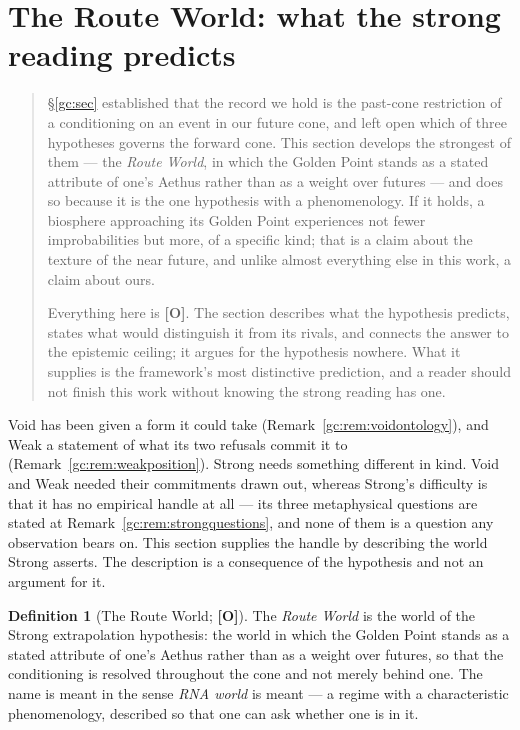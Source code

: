 \documentclass[11pt]{article}
\numberwithin{equation}{section}
\theoremstyle{plain}
\theoremstyle{definition}
\newtheorem{definition}[theorem]{Definition}
\theoremstyle{remark}
\begin{document}
\section{The Route World: what the strong reading predicts}\label{gc:subsub:routeworld}

\begin{quote}\small
\S\ref{gc:sec} established that the record we hold is the past-cone
restriction of a conditioning on an event in our future cone, and left
open which of three hypotheses governs the forward cone. This section
develops the strongest of them --- the \emph{Route World}, in which the
Golden Point stands as a stated attribute of one's Aethus rather than as
a weight over futures --- and does so because it is the one hypothesis
with a phenomenology. If it holds, a biosphere approaching its Golden
Point experiences not fewer improbabilities but more, of a specific kind;
that is a claim about the texture of the near future, and unlike almost
everything else in this work, a claim about ours.

Everything here is \textbf{[O]}. The section describes what the
hypothesis predicts, states what would distinguish it from its rivals,
and connects the answer to the epistemic ceiling; it argues for the
hypothesis nowhere. What it supplies is the framework's most distinctive
prediction, and a reader should not finish this work without knowing the
strong reading has one.
\end{quote}

Void has been given a form it could take
(Remark~\ref{gc:rem:voidontology}), and Weak a statement of what its two
refusals commit it to (Remark~\ref{gc:rem:weakposition}). Strong needs
something different in kind. Void and Weak needed their commitments
drawn out, whereas Strong's difficulty is that it has no empirical handle
at all --- its three metaphysical questions are stated at
Remark~\ref{gc:rem:strongquestions}, and none of them is a question any
observation bears on. This section supplies the handle by describing the
world Strong asserts. The description is a consequence of the hypothesis
and not an argument for it.

\begin{definition}[The Route World; \textbf{[O]}]\label{gc:def:routeworld}
The \emph{Route World} is the world of the Strong extrapolation
hypothesis: the world in which the Golden Point stands as a stated
attribute of one's Aethus rather than as a weight over futures, so that
the conditioning is resolved throughout the cone and not merely behind
one. The name is meant in the sense \emph{RNA world} is meant --- a
regime with a characteristic phenomenology, described so that one can
ask whether one is in it.
\end{definition}
\end{document}
